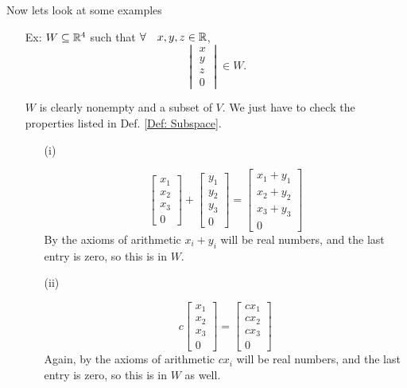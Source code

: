 \documentclass[reqno]{amsart}
\theoremstyle{definition}
\begin{document}
\bigskip
\bigskip
\bigskip
\bigskip

Now lets look at some examples

\begin{enumerate}

\setlength{\itemsep}{2em}

\item[Ex:  ]  $W \subseteq \mathbb{R}^4$ such that $\forall\quad x,y,z \in \mathbb{R}$,
%
\begin{equation*}
\begin{vmatrix}
x\\
y\\
z\\
0
\end{vmatrix} \in W.
\end{equation*}

$W$ is clearly nonempty and a subset of $V$.  We just have to check the properties listed in
Def. \ref{Def: Subspace}.

\begin{itemize}

\item[(i)  ]

\begin{equation*}
\begin{bmatrix}
x_1\\
x_2\\
x_3\\
0
\end{bmatrix} + \begin{bmatrix}
y_1\\
y_2\\
y_3\\
0
\end{bmatrix} = \begin{bmatrix}
x_1 + y_1\\
x_2 + y_2\\
x_3 + y_3\\
0
\end{bmatrix}
\end{equation*}
%
By the axioms of arithmetic $x_i + y_i$ will be real numbers, and the last entry is zero, so this is in $W$.

\item[(ii)  ]  

\begin{equation*}
c\begin{bmatrix}
x_1\\
x_2\\
x_3\\
0
\end{bmatrix} = \begin{bmatrix}
cx_1\\
cx_2\\
cx_3\\
0
\end{bmatrix}
\end{equation*}
%
Again, by the axioms of arithmetic $cx_i$ will be real numbers, and the last entry is zero, so this is in $W$ as well.


\end{itemize}
\end{enumerate}
\end{document}
